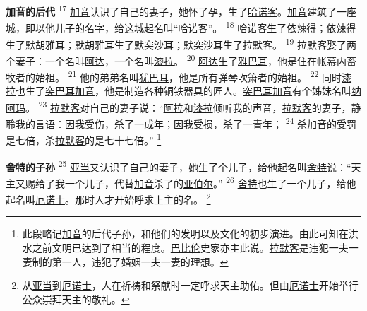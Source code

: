 \textbf{加音的后代\quad}
\textsuperscript{17}
\uline{加音}认识了自己的妻子，她怀了孕，生了\uline{哈诺客}。\uline{加音}建筑了一座城，即以他儿子的名字，给这城起名叫“\uline{哈诺客}”。
\textsuperscript{18}
\uline{哈诺客}生了\uline{依辣得}；\uline{依辣得}生了\uline{默胡雅耳}；\uline{默胡雅耳}生了\uline{默突沙耳}；\uline{默突沙耳}生了\uline{拉默客}。
\textsuperscript{19}
\uline{拉默客}娶了两个妻子：一个名叫\uline{阿达}，一个名叫\uline{漆拉}。
\textsuperscript{20}
\uline{阿达}生了\uline{雅巴耳}，他是住在帐幕内畜牧者的始祖。
\textsuperscript{21}
他的弟弟名叫\uline{犹巴耳}，他是所有弹琴吹箫者的始祖。
\textsuperscript{22}
同时\uline{漆拉}也生了\uline{突巴耳}\uline{加音}，他是制造各种铜铁器具的匠人。\uline{突巴耳}\uline{加音}有个姊妹名叫\uline{纳阿玛}。
\textsuperscript{23}
\uline{拉默客}对自己的妻子说：“\uline{阿拉}和\uline{漆拉}倾听我的声音，\uline{拉默客}的妻子，静聆我的言语：因我受伤，杀了一成年；因我受损，杀了一青年；
\textsuperscript{24}
杀\uline{加音}的受罚是七倍，杀\uline{拉默客}的是七十七倍。”
\footnote{此段略记\uline{加音}的后代子孙，和他们的发明以及文化的初步演进。由此可知在洪水之前文明已达到了相当的程度。\uline{巴比伦}史家亦主此说。\uline{拉默客}是违犯一夫一妻制的第一人，违犯了婚姻一夫一妻的理想。}

\textbf{舍特的子孙\quad}
\textsuperscript{25}
\uline{亚当}又认识了自己的妻子，她生了个儿子，给他起名叫\uline{舍特}说：“天主又赐给了我一个儿子，代替\uline{加音}杀了的\uline{亚伯尔}。”
\textsuperscript{26}
\uline{舍特}也生了一个儿子，给他起名叫\uline{厄诺士}。那时人才开始呼求上主的名。
\footnote{从\uline{亚当}到\uline{厄诺士}，人在祈祷和祭献时一定呼求天主助佑。但由\uline{厄诺士}开始举行公众崇拜天主的敬礼。}

